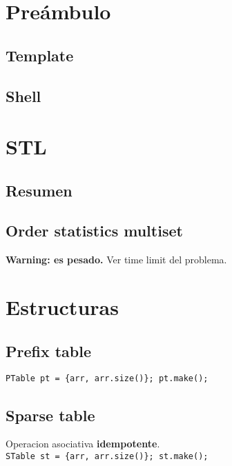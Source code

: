 

\def\title{Notebook}
\tableofcontents\newpage


\section{Preámbulo}
    \subsection{Template}
    \subsection{Shell}
        

\section{STL}
    \subsection{Resumen}
        
    \subsection{Order statistics multiset}
        \textbf{Warning: es pesado.} Ver time limit del problema.

\section{Estructuras}
    \subsection{Prefix table}
        \texttt{PTable pt = \{arr, arr.size()\}; pt.make();}

    \subsection{Sparse table}
        Operacion asociativa \textbf{idempotente}. \\
        \texttt{STable st = \{arr, arr.size()\}; st.make();}


